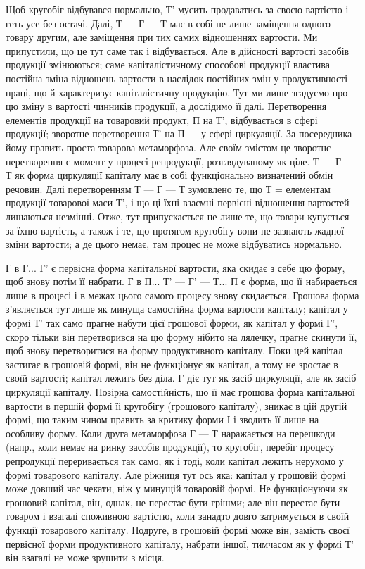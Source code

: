 Щоб кругобіг відбувався нормально, Т' мусить продаватись за своєю
вартістю і геть усе без остачі. Далі, Т — Г — Т має в собі не лише заміщення
одного товару другим, але заміщення при тих самих відношеннях
вартости. Ми припустили, що це тут саме так і відбувається. Але в дійсності
вартості засобів продукції змінюються; саме капіталістичному способові
продукції властива постійна зміна відношень вартости в наслідок постійних
змін у продуктивності праці, що й характеризує капіталістичну
продукцію. Тут ми лише згадуємо про цю зміну в вартості чинників
продукції, а дослідимо її далі. Перетворення елементів продукції на
товаровий продукт, П на Т', відбувається в сфері продукції; зворотне
перетворення Т' на П — у сфері циркуляції. За посередника йому
править проста товарова метаморфоза. Але своїм змістом це зворотнє
перетворення є момент у процесі репродукції, розглядуваному як ціле.
Т — Г — Т як форма циркуляції капіталу має в собі функціонально визначений
обмін речовин. Далі перетворенням Т — Г — Т зумовлено те, що Т
= елементам продукції товарової маси Т', і що ці їхні взаємні первісні
відношення вартостей лишаються незмінні. Отже, тут припускається не лише
те, що товари купується за їхню вартість, а також і те, що протягом
кругобігу вони не зазнають жадної зміни вартости; а де цього немає,
там процес не може відбуватись нормально.

Г в Г... Г' є первісна форма капітальної вартости, яка скидає з себе
цю форму, щоб знову потім її набрати. Г в П... Т' — Г' — Т... П
є форма, що її набирається лише в процесі і в межах цього самого
процесу знову скидається. Грошова форма з’являється тут лише як минуща
самостійна форма вартости капіталу; капітал у формі Т' так само прагне
набути цієї грошової форми, як капітал у формі Г', скоро тільки він перетворився
на цю форму нібито на лялечку, прагне скинути її, щоб знову перетворитися
на форму продуктивного капіталу. Поки цей капітал застигає в
грошовій формі, він не функціонує як капітал, а тому не зростає в своїй
вартості; капітал лежить без діла. Г діє тут як засіб циркуляції, але як засіб
циркуляції капіталу. Позірна самостійність, що її має грошова форма
капітальної вартости в першій формі їі кругобігу (грошового капіталу),
зникає в цій другій формі, що таким чином править за критику форми І і
зводить її лише на особливу форму. Коли друга метаморфоза Г — Т наражається
на перешкоди (напр., коли немає на ринку засобів продукції),
то кругобіг, перебіг процесу репродукції переривається так само, як
і тоді, коли капітал лежить нерухомо у формі товарового капіталу. Але
ріжниця тут ось яка: капітал у грошовій формі може довший час чекати,
ніж у минущій товаровій формі. Не функціонуючи як грошовий капітал,
він, однак, не перестає бути грішми; але він перестає бути товаром
і взагалі споживною вартістю, коли занадто довго затримується в своїй
функції товарового капіталу. Подруге, в грошовій формі може він,
замість своєї первісної форми продуктивного капіталу, набрати іншої,
тимчасом як у формі Т' він взагалі не може зрушити з місця.

